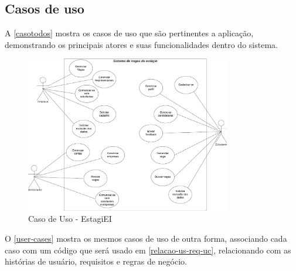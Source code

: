 \subsection{Casos de uso}

A \autoref{casotodos} mostra os casos de uso que são pertinentes a aplicação, demonstrando os principais atores e suas funcionalidades dentro do sistema.


\begin{figure}[H]
	\centering
	\caption{\label{casotodos}Caso de Uso - EstagiEI}
	\includegraphics[width=0.8\textwidth]{../imagens/caso-de-uso.png}
\end{figure}

O \autoref{user-cases} mostra os mesmos casos de uso de outra forma, associando cada caso com um código que será usado em \autoref{relacao-us-req-uc}, relacionando com as histórias de usuário, requisitos e regras de negócio.

